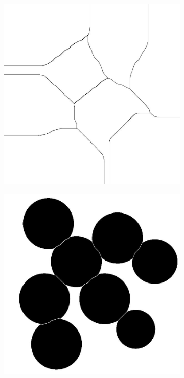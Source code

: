 \begin{figure}[ht!]
\begin{subfigure}{0.4\textwidth}
        \caption{}
        \label{img:erosed_circles}
    \end{subfigure}
    \begin{subfigure}{0.4\textwidth}
        \centering
        \includegraphics[width=\textwidth]{images/transformed_images/2/boundaries.jpg}
        \caption{}
        \label{img:boudaries}
    \end{subfigure}
    \begin{subfigure}{0.4\textwidth}
        \centering
        \includegraphics[width=\textwidth]{images/transformed_images/2/result.jpg}

\end{subfigure}
\end{figure}
